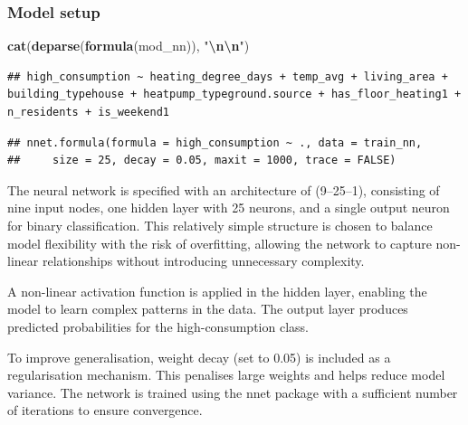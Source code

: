 \documentclass[
]{article}
\newenvironment{Shaded}{\begin{snugshade}}{\end{snugshade}}
\newcommand{\FunctionTok}[1]{\textcolor[rgb]{0.13,0.29,0.53}{\textbf{#1}}}
\newcommand{\NormalTok}[1]{#1}
\newcommand{\SpecialCharTok}[1]{\textcolor[rgb]{0.81,0.36,0.00}{\textbf{#1}}}
\newcommand{\StringTok}[1]{\textcolor[rgb]{0.31,0.60,0.02}{#1}}
\begin{document}
\subsubsection{Model setup}\label{model-setup-4}

\begin{Shaded}
\begin{Highlighting}[]
\FunctionTok{cat}\NormalTok{(}\FunctionTok{deparse}\NormalTok{(}\FunctionTok{formula}\NormalTok{(mod\_nn)), }\StringTok{"}\SpecialCharTok{\textbackslash{}n\textbackslash{}n}\StringTok{"}\NormalTok{)}
\end{Highlighting}
\end{Shaded}

\begin{verbatim}
## high_consumption ~ heating_degree_days + temp_avg + living_area +      building_typehouse + heatpump_typeground.source + has_floor_heating1 +      n_residents + is_weekend1
\end{verbatim}

\begin{Shaded}
\end{Shaded}

\begin{verbatim}
## nnet.formula(formula = high_consumption ~ ., data = train_nn, 
##     size = 25, decay = 0.05, maxit = 1000, trace = FALSE)
\end{verbatim}

The neural network is specified with an architecture of (9--25--1),
consisting of nine input nodes, one hidden layer with 25 neurons, and a
single output neuron for binary classification. This relatively simple
structure is chosen to balance model flexibility with the risk of
overfitting, allowing the network to capture non-linear relationships
without introducing unnecessary complexity.

A non-linear activation function is applied in the hidden layer,
enabling the model to learn complex patterns in the data. The output
layer produces predicted probabilities for the high-consumption class.

To improve generalisation, weight decay (set to 0.05) is included as a
regularisation mechanism. This penalises large weights and helps reduce
model variance. The network is trained using the nnet package with a
sufficient number of iterations to ensure convergence.
\end{document}
